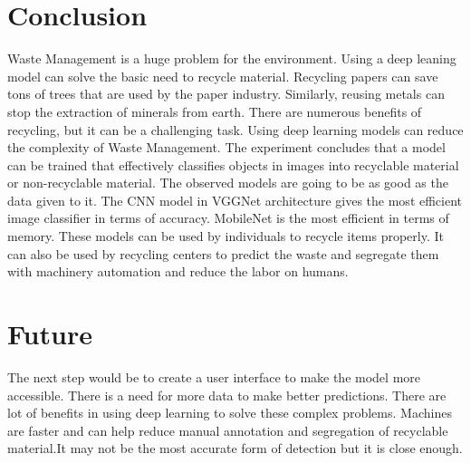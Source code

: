 \documentclass[10pt,twocolumn,letterpaper]{article}
\begin{document}
\section{Conclusion}
Waste Management is a huge problem for the environment. Using a deep leaning model can solve the basic need to recycle material. Recycling papers can save tons of trees that are used by the paper industry. Similarly, reusing metals can stop the extraction of minerals from earth. There are numerous benefits of recycling, but it can be a challenging task. Using deep learning models can reduce the complexity of Waste Management.
The experiment concludes that a model can be trained that effectively classifies objects in images into recyclable material or non-recyclable material. The observed models are going to be as good as the data given to it. The CNN model in VGGNet architecture gives the most efficient image classifier in terms of accuracy. MobileNet is the most efficient in terms of memory.
These models can be used by individuals to recycle items properly. It can also be used by recycling centers to predict the waste and segregate them with machinery automation and reduce the labor on humans.

\section{Future}
The next step would be to create a user interface to make the model more accessible. There is a need for more data to make better predictions. 
There are lot of benefits in using deep learning to solve these complex problems. Machines are faster and can help reduce manual annotation and segregation of recyclable material.It may not be the most accurate form of detection but it is close enough.
\end{document}
